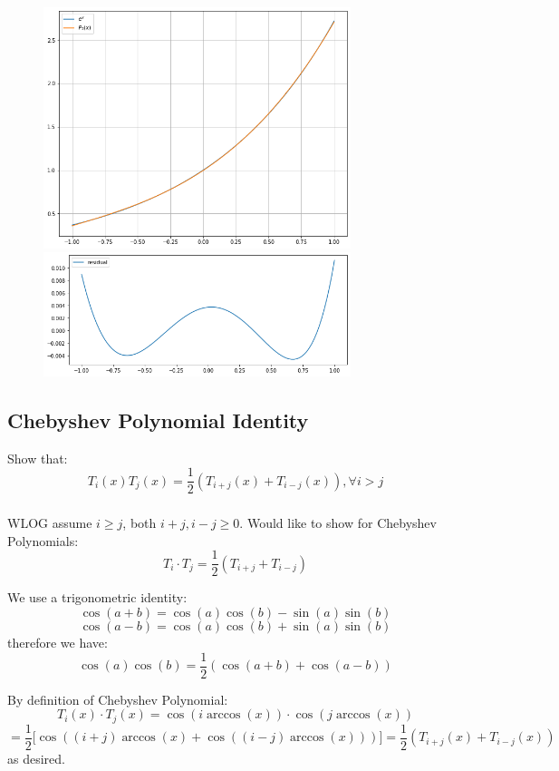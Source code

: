 \documentclass[12pt]{article} %
\newcommand{\1}[1]{\mathds{1}\left[#1\right]}
\begin{document}
\begin{figure}[h]
\centering
\includegraphics[width=0.8\textwidth]{p1poly3.png}
\includegraphics[width=0.8\textwidth]{p1poly3_res.png}
\end{figure}


\newpage
\subsection{Chebyshev Polynomial Identity}
Show that:
$$
	T_i(x)T_j(x) =\frac12 (T_{i+j}(x) + T_{i-j}(x)), \forall i>j
$$
\subsubsection{}
WLOG assume $i\ge j$, both $i+j, i-j\ge0$. Would like to show for Chebyshev Polynomials:
$$
	T_i\cdot T_j = \frac12 (T_{i+j} + T_{i-j})
$$

We use a trigonometric identity:
$$
\cos(a+b) = \cos(a)\cos(b) - \sin(a)\sin(b)
$$
$$
	\cos(a-b) = \cos(a)\cos(b) + \sin(a)\sin(b)
$$ therefore we have:
$$
	\cos(a)\cos(b) = \frac12(\cos(a+b) + \cos(a-b))
$$

By definition of Chebyshev Polynomial:
$$
	T_i(x)\cdot T_j(x) = \cos(i\arccos(x))\cdot \cos(j\arccos(x)) 
$$
$$= \frac{1}{2}\bigg[
	\cos((i+j)\arccos(x) + \cos((i-j)\arccos(x)))
	\bigg] = \frac12(T_{i+j}(x) + T_{i-j}(x))
$$ as desired.
\end{document}
